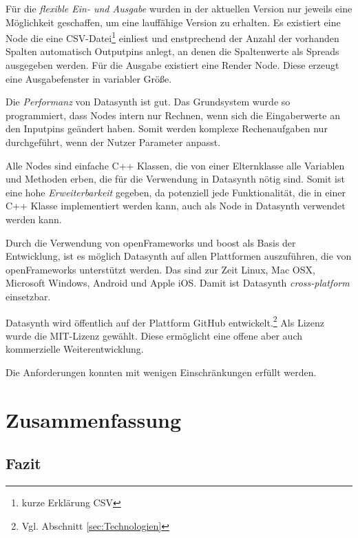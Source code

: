\documentclass[a4paper, 12pt, DIVcalc, onepage, pdftex, headsepline, footsepline]{scrreprt}
\begin{document}
Für die \textit{flexible Ein- und Ausgabe} wurden in der aktuellen
Version nur jeweils eine Möglichkeit geschaffen, um eine lauffähige
Version zu erhalten. Es existiert eine Node die eine CSV-Datei\footnote{kurze
Erklärung CSV} einliest und enstprechend der Anzahl der vorhanden
Spalten automatisch Outputpins anlegt, an denen die Spaltenwerte als
Spreads ausgegeben werden. Für die Ausgabe existiert eine Render Node.
Diese erzeugt eine Ausgabefenster in variabler Größe.

Die \textit{Performanz} von Datasynth ist gut. Das Grundsystem wurde so
programmiert, dass Nodes intern nur Rechnen, wenn sich die Eingaberwerte
an den Inputpins geändert haben. Somit werden komplexe Rechenaufgaben nur
durchgeführt, wenn der Nutzer Parameter anpasst.

Alle Nodes sind einfache C++ Klassen, die von einer Elternklasse
alle Variablen und Methoden erben, die für die Verwendung in Datasynth
nötig sind. Somit ist eine hohe \textit{Erweiterbarkeit} gegeben, da potenziell jede
Funktionalität, die in einer C++ Klasse implementiert werden kann, auch
als Node in Datasynth verwendet werden kann.

Durch die Verwendung von openFrameworks und boost als Basis der Entwicklung,
ist es möglich Datasynth auf allen Plattformen auszuführen, die von openFrameworks
unterstützt werden. Das sind zur Zeit Linux, Mac OSX, Microsoft Windows, Android
und Apple iOS. Damit ist Datasynth \textit{cross-platform} einsetzbar.

Datasynth wird öffentlich auf der Plattform GitHub entwickelt.\footnote{Vgl.
Abschnitt \ref{sec:Technologien}} Als Lizenz wurde die MIT-Lizenz gewählt.
Diese ermöglicht eine offene aber auch kommerzielle Weiterentwicklung.

Die Anforderungen konnten mit wenigen Einschränkungen erfüllt werden.

\chapter{Zusammenfassung}
\label{cha:Zusammenfassung}
\section{Fazit}
\label{sec:Fazit}
\end{document}
